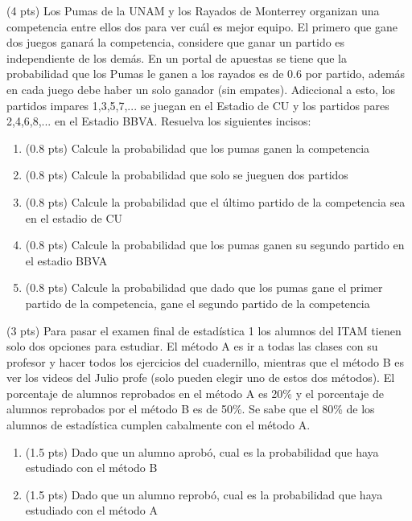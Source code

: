 \documentclass[addpoints]{exam}
\theoremstyle{mytheor}
\begin{document}
  \begin{questions} 
  
  \question (4 pts) 
  Los Pumas de la UNAM y los Rayados de Monterrey organizan una competencia entre ellos dos para ver cuál es mejor equipo. El primero que gane dos juegos ganará la competencia, considere que ganar un partido es independiente de los demás. En un portal de apuestas se tiene que la probabilidad que los Pumas le ganen a los rayados es de 0.6 por partido, además en cada juego debe haber un solo ganador (sin empates). Adiccional a esto, los partidos impares 1,3,5,7,... se juegan en el Estadio de CU y los partidos pares 2,4,6,8,... en el Estadio BBVA. Resuelva los siguientes incisos:
  \begin{enumerate}[label=\Alph*)]
  \item (0.8 pts) Calcule la probabilidad que los pumas ganen la competencia
  \item (0.8 pts) Calcule la probabilidad que solo se jueguen dos partidos
  \item (0.8 pts) Calcule la probabilidad que el último partido de la competencia sea en el estadio de CU
  \item (0.8 pts) Calcule la probabilidad que los pumas ganen su segundo partido en el estadio BBVA
  \item (0.8 pts) Calcule la probabilidad que dado que los pumas gane el primer partido de la competencia, gane el segundo partido de la competencia
  \end{enumerate}
  
\question (3 pts)
Para pasar el examen final de estadística 1 los alumnos del ITAM tienen solo dos opciones para estudiar. El método A es ir a todas las clases con su profesor y hacer todos los ejercicios del cuadernillo, mientras que el método B es ver los videos del Julio profe (solo pueden elegir uno de estos dos métodos). El porcentaje de alumnos reprobados en el método A es 20\% y el porcentaje de alumnos reprobados por el método B es de 50\%. Se sabe que el 80\% de los alumnos de estadística cumplen cabalmente con el método A. 
\begin{enumerate}[label=\Alph*)]
\item (1.5 pts) Dado que un alumno aprobó, cual es la probabilidad que haya estudiado con el método B
\item (1.5 pts) Dado que un alumno reprobó, cual es la probabilidad que haya estudiado con el método A
\end{enumerate}


\end{questions}
\end{document}
